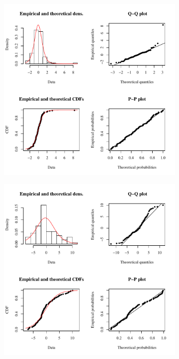 \subfiguremid
\begin{landscape}
	\begin{figure}
		\begin{subfigure}{0.7\textwidth}
			\centering
			\includegraphics[width=\tableCustomSize]{"Figures/Results_USR/Stochastic/Conc Model res-fit UDIV"}
		\end{subfigure}%
		\begin{subfigure}{0.7\textwidth}
			\centering
			\includegraphics[width=\tableCustomSize]{"Figures/Results_USR/Stochastic/Conc Model res-fit WTP"}

\end{subfigure}
\end{figure}
\end{landscape}

